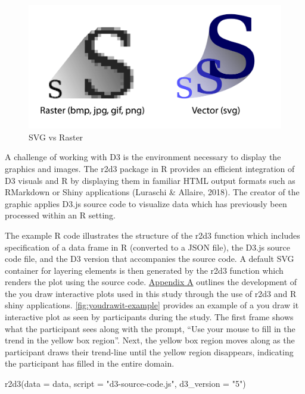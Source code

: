\documentclass[print]{nuthesis}
\newenvironment{Shaded}{\begin{snugshade}}{\end{snugshade}}
\newcommand{\AttributeTok}[1]{\textcolor[rgb]{0.77,0.63,0.00}{#1}}
\newcommand{\FunctionTok}[1]{\textcolor[rgb]{0.00,0.00,0.00}{#1}}
\newcommand{\NormalTok}[1]{#1}
\newcommand{\StringTok}[1]{\textcolor[rgb]{0.31,0.60,0.02}{#1}}
\begin{document}
\begin{figure}[tbp]

{\centering \includegraphics[width=0.7\linewidth,]{images/raster-vs-vector} 

}

\caption{SVG vs Raster}\label{fig:raster-vs-vector}
\end{figure}

A challenge of working with D3 is the environment necessary to display the graphics and images.
The r2d3 package in R provides an efficient integration of D3 visuals and R by displaying them in familiar HTML output formats such as RMarkdown or Shiny applications (Luraschi \& Allaire, 2018).
The creator of the graphic applies D3.js source code to visualize data which has previously been processed within an R setting.

The example R code illustrates the structure of the r2d3 function which includes specification of a data frame in R (converted to a JSON file), the D3.js source code file, and the D3 version that accompanies the source code.
A default SVG container for layering elements is then generated by the r2d3 function which renders the plot using the source code.
\protect\hyperlink{youdrawit-with-shiny}{Appendix A} outlines the development of the you draw interactive plots used in this study through the use of r2d3 and R shiny applications.
\cref{fig:youdrawit-example} provides an example of a you draw it interactive plot as seen by participants during the study.
The first frame shows what the participant sees along with the prompt, ``Use your mouse to fill in the trend in the yellow box region''.
Next, the yellow box region moves along as the participant draws their trend-line until the yellow region disappears, indicating the participant has filled in the entire domain.

\begin{Shaded}
\begin{Highlighting}[]
\FunctionTok{r2d3}\NormalTok{(}\AttributeTok{data =}\NormalTok{ data, }\AttributeTok{script =} \StringTok{"d3{-}source{-}code.js"}\NormalTok{,}
    \AttributeTok{d3\_version =} \StringTok{"5"}\NormalTok{)}
\end{Highlighting}
\end{Shaded}
\end{document}
